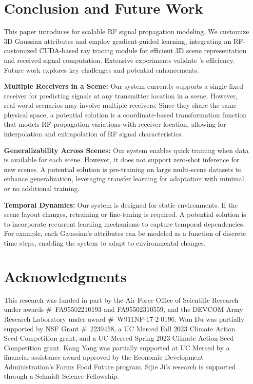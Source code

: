 \section{Conclusion and Future Work}\label{sec_conclusion}



This paper introduces \ourSystem for scalable RF signal propagation modeling.  
We customize 3D Gaussian attributes and employ gradient-guided learning, integrating an RF-customized CUDA-based ray tracing module for efficient 3D scene representation and received signal computation.
Extensive experiments validate \ourSystem's efficiency.
Future work explores key challenges and potential enhancements.


\textbf{Multiple Receivers in a Scene:}
Our system currently supports a single fixed receiver for predicting signals at any transmitter location in a scene. 
However, real-world scenarios may involve multiple receivers.  
Since they share the same physical space, a potential solution is a coordinate-based transformation function that models RF propagation variations with receiver location, allowing for interpolation and extrapolation of RF signal characteristics.



\textbf{Generalizability Across Scenes:} 
Our system enables quick training when data is available for each scene.  
However, it does not support zero-shot inference for new scenes.  
A potential solution is pre-training on large multi-scene datasets to enhance generalization, leveraging transfer learning for adaptation with minimal or no additional training.



\textbf{Temporal Dynamics:}  
Our system is designed for static environments.  
If the scene layout changes, retraining or fine-tuning is required.  
A potential solution is to incorporate recurrent learning mechanisms to capture temporal dependencies.  
For example, each Gaussian’s attributes can be modeled as a function of discrete time steps, enabling the system to adapt to environmental changes.



\section*{Acknowledgments}
This research was funded in part by the Air Force Office of Scientific Research under awards \#~FA95502210193 and FA95502310559, and the DEVCOM Army Research Laboratory under award \#~W911NF-17-2-0196.
Wan Du was partially supported by NSF Grant \#~2239458, a UC Merced Fall 2023 Climate Action Seed Competition grant, and a UC Merced Spring 2023 Climate Action Seed Competition grant. 
Kang Yang was partially supported at UC Merced by a financial assistance award approved by the Economic Development Administration’s Farms Food Future program.
Sijie Ji's research is supported through a  Schmidt Science Fellowship.





